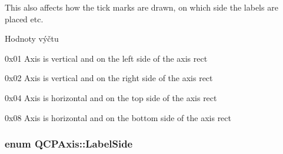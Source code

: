 This also affects how the tick marks are drawn, on which side the labels are placed etc. \begin{Desc}
\item[Hodnoty výčtu]\par
\begin{description}
\item[{\em 
\hypertarget{classQCPAxis_ae2bcc1728b382f10f064612b368bc18aaf84aa6cac6fb6099f54a2cbf7546b730}{}at\+Left\label{classQCPAxis_ae2bcc1728b382f10f064612b368bc18aaf84aa6cac6fb6099f54a2cbf7546b730}
}]{\ttfamily 0x01} Axis is vertical and on the left side of the axis rect \item[{\em 
\hypertarget{classQCPAxis_ae2bcc1728b382f10f064612b368bc18aadf5509f7d29199ef2f263b1dd224b345}{}at\+Right\label{classQCPAxis_ae2bcc1728b382f10f064612b368bc18aadf5509f7d29199ef2f263b1dd224b345}
}]{\ttfamily 0x02} Axis is vertical and on the right side of the axis rect \item[{\em 
\hypertarget{classQCPAxis_ae2bcc1728b382f10f064612b368bc18aac0ece2b680d3f545e701f75af1655977}{}at\+Top\label{classQCPAxis_ae2bcc1728b382f10f064612b368bc18aac0ece2b680d3f545e701f75af1655977}
}]{\ttfamily 0x04} Axis is horizontal and on the top side of the axis rect \item[{\em 
\hypertarget{classQCPAxis_ae2bcc1728b382f10f064612b368bc18aa220d68888516b6c3b493d144f1ba438f}{}at\+Bottom\label{classQCPAxis_ae2bcc1728b382f10f064612b368bc18aa220d68888516b6c3b493d144f1ba438f}
}]{\ttfamily 0x08} Axis is horizontal and on the bottom side of the axis rect \end{description}
\end{Desc}
\hypertarget{classQCPAxis_a24b13374b9b8f75f47eed2ea78c37db9}{}
\subsubsection[{Label\+Side}]{\setlength{\rightskip}{0pt plus 5cm}enum {\bf Q\+C\+P\+Axis\+::\+Label\+Side}}\label{classQCPAxis_a24b13374b9b8f75f47eed2ea78c37db9}


